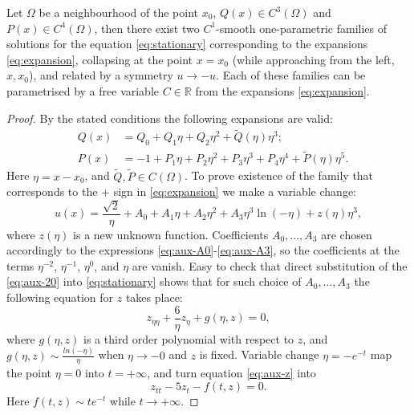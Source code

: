 \begin{proposition}
	Let $\Omega$ be a neighbourhood of the point $x_0$, $Q(x) \in C^3(\Omega)$ and $P(x) \in C^4(\Omega)$, then there exist two $C^1$-smooth one-parametric families of solutions for the equation \eqref{eq:stationary} corresponding to the expansions \eqref{eq:expansion}, collapsing at the point $x = x_0$ (while approaching from the left, $x , x_0$), and related by a symmetry $u \to -u$.
	Each of these families can be parametrised by a free variable $C \in \mathbb{R}$ from the expansions \eqref{eq:expansion}.
\end{proposition}
\begin{proof}
	By the stated conditions the following expansions are valid:
	\begin{eqnarray}
		& Q(x) & = Q_0 + Q_1 \eta + Q_2 \eta^2 + \widetilde{Q}(\eta) \eta^3; \\
		& P(x) & = -1 + P_1 \eta + P_2 \eta^2 + P_3 \eta^3 + P_4 \eta^4 + \widetilde{P}(\eta) \eta^5.
	\end{eqnarray}
	Here $\eta = x - x_0$, and $\widetilde{Q}, \widetilde{P} \in C(\Omega)$.
	To prove existence of the family that corresponds to the $+$ sign in \eqref{eq:expansion}	 we make a variable change:
	\begin{equation}
		u(x) = \dfrac{\sqrt{2}}{\eta} + A_0 + A_1 \eta + A_2 \eta^2 + A_3 \eta^3 \ln(-\eta) + z(\eta) \eta^3,
		\label{eq:aux-20}
	\end{equation}
	where $z(\eta)$ is a new unknown function.
	Coefficients $A_0, \dots, A_3$ are chosen accordingly to the expressions \eqref{eq:aux-A0}-\eqref{eq:aux-A3}, so the coefficients at the terms $\eta^{-2}$, $\eta^{-1}$, $\eta^0$, and $\eta$ are vanish.
	Easy to check that direct substitution of the \eqref{eq:aux-20} into \eqref{eq:stationary} shows that for such choice of $A_0, \dots, A_3$ the following equation for $z$ takes place:
	\begin{equation}
		z_{\eta\eta} + \dfrac{6}{\eta} z_{\eta} + g(\eta, z) = 0,
		\label{eq:aux-z}
	\end{equation}
	where $g(\eta, z)$ is a third order polynomial with respect to $z$, and $g(\eta, z) \sim \frac{ln(-\eta)}{\eta}$ when $\eta \to -0$ and $z$ is fixed.
	Variable change $\eta = -e^{-t}$ map the point $\eta = 0$ into $t = +\infty$, and turn equation \eqref{eq:aux-z} into
	\begin{equation}
		z_{tt} - 5z_t - f(t, z) = 0.
		\label{eq:aux-zt}
	\end{equation}
	Here $f(t, z) \sim t e^{-t}$ while $t \to +\infty$.

\end{proof}

